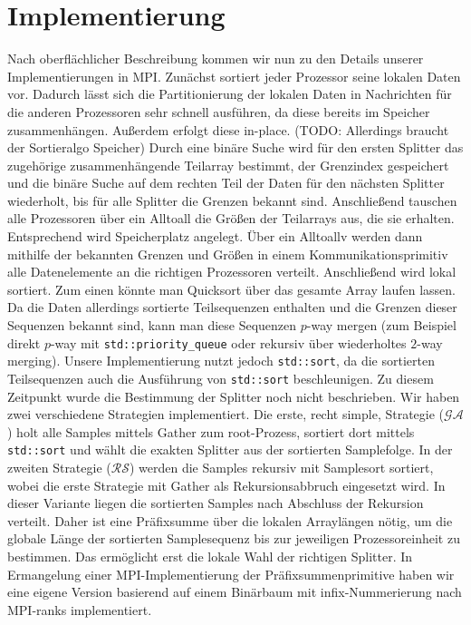 \documentclass{llncs}
\begin{document}
\section{Implementierung}
Nach oberflächlicher Beschreibung kommen wir nun zu den Details unserer Implementierungen in MPI.
Zunächst sortiert jeder Prozessor seine lokalen Daten vor. Dadurch lässt sich die Partitionierung der lokalen Daten in Nachrichten für die anderen Prozessoren sehr schnell ausführen, da diese bereits im Speicher zusammenhängen. Außerdem erfolgt diese in-place. (TODO: Allerdings braucht der Sortieralgo Speicher) Durch eine binäre Suche wird für den ersten Splitter das zugehörige zusammenhängende Teilarray bestimmt, der Grenzindex gespeichert und die binäre Suche auf dem rechten Teil der Daten für den nächsten Splitter wiederholt, bis für alle Splitter die Grenzen bekannt sind. Anschließend tauschen alle Prozessoren über ein Alltoall die Größen der Teilarrays aus, die sie erhalten. Entsprechend wird Speicherplatz angelegt. Über ein Alltoallv werden dann mithilfe der bekannten Grenzen und Größen in einem Kommunikationsprimitiv alle Datenelemente an die richtigen Prozessoren verteilt. Anschließend wird lokal sortiert. Zum einen könnte man Quicksort über das gesamte Array laufen lassen. Da die Daten allerdings sortierte Teilsequenzen enthalten und die Grenzen dieser Sequenzen bekannt sind, kann man diese Sequenzen $p$-way mergen (zum Beispiel direkt $p$-way mit \texttt{std::priority_queue} oder rekursiv über wiederholtes $2$-way merging). Unsere Implementierung nutzt jedoch \texttt{std::sort}, da die sortierten Teilsequenzen auch die Ausführung von \texttt{std::sort} beschleunigen.\newline\newline
Zu diesem Zeitpunkt wurde die Bestimmung der Splitter noch nicht beschrieben. Wir haben zwei verschiedene Strategien implementiert. Die erste, recht simple, Strategie ($\mathcal{GA}$) holt alle Samples mittels Gather zum root-Prozess, sortiert dort mittels \texttt{std::sort} und wählt die exakten Splitter aus der sortierten Samplefolge. In der zweiten Strategie ($\mathcal{RS}$) werden die Samples rekursiv mit Samplesort sortiert, wobei die erste Strategie mit Gather als Rekursionsabbruch eingesetzt wird. In dieser Variante liegen die sortierten Samples nach Abschluss der Rekursion verteilt. Daher ist eine Präfixsumme über die lokalen Arraylängen nötig, um die globale Länge der sortierten Samplesequenz bis zur jeweiligen Prozessoreinheit zu bestimmen. Das ermöglicht erst die lokale Wahl der richtigen Splitter. In Ermangelung einer MPI-Implementierung der Präfixsummenprimitive haben wir eine eigene Version basierend auf einem Binärbaum mit infix-Nummerierung nach MPI-ranks implementiert. 
\end{document}
